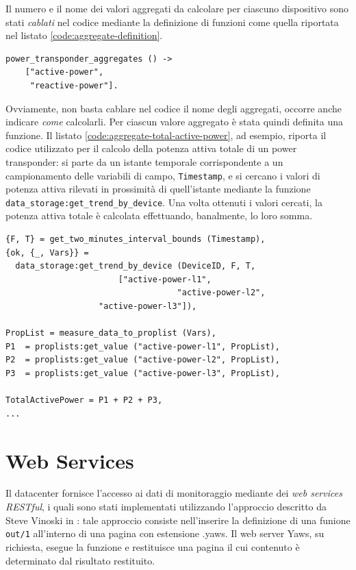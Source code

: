 %
Il numero e il nome dei valori aggregati da calcolare per ciascuno dispositivo
sono stati \emph{cablati} nel codice mediante la definizione di funzioni 
come quella riportata nel listato \ref{code:aggregate-definition}.
%
\begin{lstlisting}[caption={Definizione degli aggregati per il Power/Inverter Transponder}, label={code:aggregate-definition},frame=trBL]
power_transponder_aggregates () ->
    ["active-power",
     "reactive-power"].
\end{lstlisting}
%

%
Ovviamente, non basta cablare nel codice il nome degli aggregati, occorre anche 
indicare \emph{come} calcolarli.
%
Per ciascun valore aggregato \`e stata quindi definita una funzione.
%
Il listato \ref{code:aggregate-total-active-power}, ad esempio, riporta il codice 
utilizzato per il calcolo della potenza attiva totale di un power transponder: 
si parte da un istante temporale corrispondente a un campionamento delle variabili di 
campo, \texttt{Timestamp}, e si cercano i valori di potenza attiva rilevati in prossimit\`a
di quell'istante mediante la funzione \texttt{data\_storage:get\_trend\_by\_device}.
%
Una volta ottenuti i valori cercati, la potenza attiva totale \`e calcolata effettuando,
banalmente, lo loro somma.
%
\begin{lstlisting}[caption={Calcolo della potenza attiva totale}, label={code:aggregate-total-active-power},frame=trBL]
{F, T} = get_two_minutes_interval_bounds (Timestamp),
{ok, {_, Vars}} = 
  data_storage:get_trend_by_device (DeviceID, F, T, 
   			           ["active-power-l1",
                                   "active-power-l2",
				   "active-power-l3"]),
	      
PropList = measure_data_to_proplist (Vars),
P1  = proplists:get_value ("active-power-l1", PropList),
P2  = proplists:get_value ("active-power-l2", PropList),
P3  = proplists:get_value ("active-power-l3", PropList),
	      
TotalActivePower = P1 + P2 + P3, 
...
\end{lstlisting}
%

%
\section{Web Services}
Il datacenter fornisce l'accesso ai dati di monitoraggio mediante dei \emph{web services
RESTful}, i quali sono stati implementati utilizzando l'approccio descritto da Steve 
Vinoski in \cite{vinoski}: tale approccio consiste nell'inserire la definizione di una
funione \texttt{out/1} all'interno di una pagina con estensione .yaws.
%
Il web server Yaws, su richiesta, esegue la funzione e restituisce una pagina il cui contenuto
\`e determinato dal risultato restituito.
%

